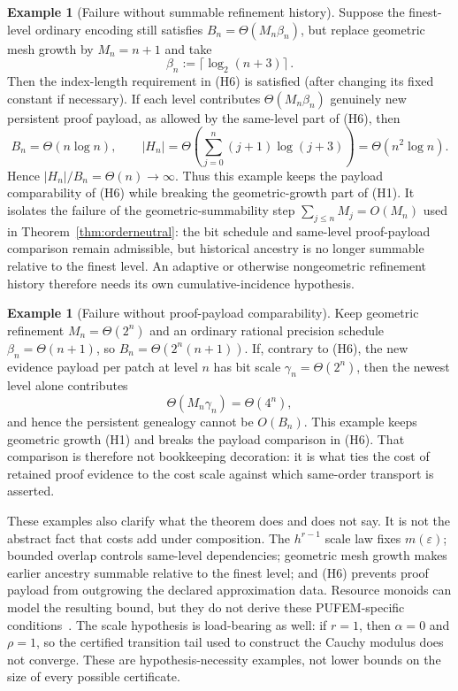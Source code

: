 \documentclass[11pt]{article}
\theoremstyle{definition}
\newtheorem{example}[theorem]{Example}
\begin{document}
\begin{example}[Failure without summable refinement history]\label{ex:nonsummable}
Suppose the finest-level ordinary encoding still satisfies $B_n=\Theta(M_n\beta_n)$, but
replace geometric mesh growth by $M_n=n+1$ and take
\[
 \beta_n:=\lceil\log_2(n+3)\rceil\,.
\]
Then the index-length requirement in (H6) is satisfied (after changing its fixed constant
if necessary).  If each level contributes $\Theta(M_n\beta_n)$ genuinely new persistent
proof payload, as allowed by the same-level part of (H6), then
\[
 B_n=\Theta(n\log n),\qquad
 |H_n|=\Theta\!\left(\sum_{j=0}^n(j+1)\log(j+3)\right)=\Theta(n^2\log n).
\]
Hence $|H_n|/B_n=\Theta(n)\to\infty$.  Thus this example keeps the payload
comparability of (H6) while breaking the geometric-growth part of (H1).  It isolates the failure of the geometric-summability
step $\sum_{j\le n}M_j=O(M_n)$ used in Theorem~\ref{thm:orderneutral}: the bit schedule and
same-level proof-payload comparison remain admissible, but historical ancestry is no longer
summable relative to the finest level.  An adaptive or otherwise nongeometric refinement
history therefore needs its own cumulative-incidence hypothesis.
\end{example}

\begin{example}[Failure without proof-payload comparability]\label{ex:payload}
Keep geometric refinement $M_n=\Theta(2^n)$ and an ordinary rational precision schedule
$\beta_n=\Theta(n+1)$, so $B_n=\Theta(2^n(n+1))$.  If, contrary to (H6), the new evidence
payload per patch at level $n$ has bit scale $\gamma_n=\Theta(2^n)$, then the newest level
alone contributes
\[
 \Theta(M_n\gamma_n)=\Theta(4^n),
\]
and hence the persistent genealogy cannot be $O(B_n)$.  This example keeps geometric growth (H1) and breaks the payload comparison in (H6).
That comparison is therefore not bookkeeping decoration: it is what ties the cost of retained proof evidence
to the cost scale against which same-order transport is asserted.
\end{example}

These examples also clarify what the theorem does and does not say.  It is not the abstract
fact that costs add under composition.  The $h^{r-1}$ scale law fixes $m(\varepsilon)$; bounded
overlap controls same-level dependencies; geometric mesh growth makes earlier ancestry
summable relative to the finest level; and (H6) prevents proof payload from outgrowing the
declared approximation data.  Resource monoids can model the resulting bound, but they do not derive these PUFEM-specific
conditions~\cite{HofmannLedent}.  The scale hypothesis is load-bearing as well: if $r=1$,
then $\alpha=0$ and $\rho=1$, so the certified transition tail used to construct the Cauchy
modulus does not converge.  These are hypothesis-necessity examples, not lower bounds on
the size of every possible certificate.
\end{document}
